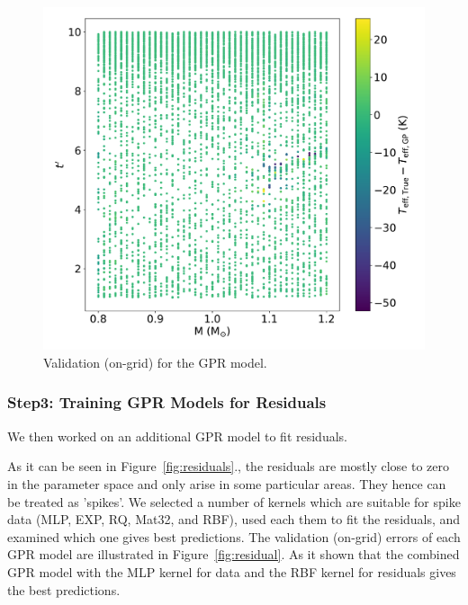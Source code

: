 \begin{figure}
	\includegraphics[width=1.0\columnwidth]{M0_ongrid_validation.pdf}
    \caption{Validation (on-grid) for the GPR model.}  
    \label{fig:validation0l}
\end{figure}



\subsubsection{Step3: Training GPR Models for Residuals}

We then worked on an additional GPR model to fit residuals. 

As it can be seen in Figure~\ref{fig:residuals}., the residuals are mostly close to zero in the parameter space and only arise in some particular areas. They hence can be treated as 'spikes'. We selected a number of kernels which are suitable for spike data (MLP, EXP, RQ, Mat32, and RBF), used each them to fit the residuals, and examined which one gives best predictions. The validation (on-grid) errors of each GPR model are illustrated in Figure~\ref{fig:residual}. As it shown that the combined GPR model with the MLP kernel for data and the RBF kernel for residuals gives the best predictions. 

